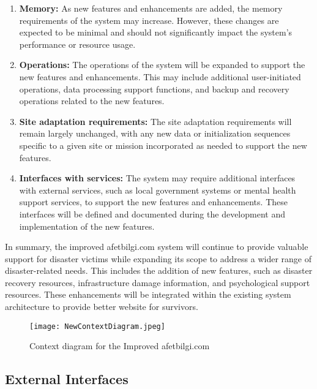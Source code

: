 \documentclass[11pt,a4paper]{article}
\begin{document}
\begin{enumerate}[label=(\alph*)]
    \item \textbf{Memory:}
    As new features and enhancements are added, the memory requirements of the system may increase. However, these changes are expected to be minimal and should not significantly impact the system's performance or resource usage.
    
    \item \textbf{Operations:}
    The operations of the system will be expanded to support the new features and enhancements. This may include additional user-initiated operations, data processing support functions, and backup and recovery operations related to the new features.
    
    \item \textbf{Site adaptation requirements:}
    The site adaptation requirements will remain largely unchanged, with any new data or initialization sequences specific to a given site or mission incorporated as needed to support the new features.
    
    \item \textbf{Interfaces with services:}
    The system may require additional interfaces with external services, such as local government systems or mental health support services, to support the new features and enhancements. These interfaces will be defined and documented during the development and implementation of the new features.

\end{enumerate}

\newpage

In summary, the improved afetbilgi.com system will continue to provide valuable support for disaster victims while expanding its scope to address a wider range of disaster-related needs. This includes the addition of new features, such as disaster recovery resources, infrastructure damage information, and psychological support resources. These enhancements will be integrated within the existing system architecture to provide better website for survivors.

\begin{figure}[H]
    \centering
    \texttt{[image: NewContextDiagram.jpeg]}
    \caption{Context diagram for the Improved afetbilgi.com}
    \label{Context Diagram for improved afetbilgi.com}
\end{figure}

\newpage

\subsection{External Interfaces}
\end{document}

